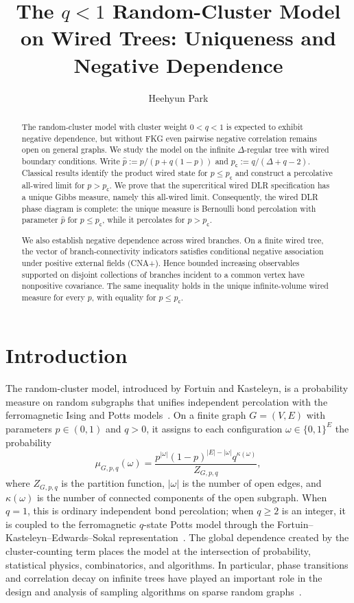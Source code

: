 \documentclass[11pt]{amsart}
\title{The $q<1$ Random-Cluster Model on Wired Trees: Uniqueness and Negative Dependence}
\author{Heehyun Park}
\theoremstyle{plain}
\theoremstyle{definition}
\theoremstyle{remark}
\begin{document}
\begin{abstract}
The random-cluster model with cluster weight $0<q<1$ is expected to exhibit negative dependence, but without FKG even pairwise negative correlation remains open on general graphs. We study the model on the infinite $\Delta$-regular tree with wired boundary conditions. Write $\widehat p:=p/(p+q(1-p))$ and $p_{\mathsf c}:=q/(\Delta+q-2)$. Classical results identify the product wired state for $p\le p_{\mathsf c}$ and construct a percolative all-wired limit for $p>p_{\mathsf c}$. We prove that the supercritical wired DLR specification has a unique Gibbs measure, namely this all-wired limit. Consequently, the wired DLR phase diagram is complete: the unique measure is Bernoulli bond percolation with parameter $\widehat p$ for $p\le p_{\mathsf c}$, while it percolates for $p>p_{\mathsf c}$.

We also establish negative dependence across wired branches. On a finite wired tree, the vector of branch-connectivity indicators satisfies conditional negative association under positive external fields (CNA+). Hence bounded increasing observables supported on disjoint collections of branches incident to a common vertex have nonpositive covariance. The same inequality holds in the unique infinite-volume wired measure for every $p$, with equality for $p\le p_{\mathsf c}$.
\end{abstract}

\maketitle
\section{Introduction}

The random-cluster model, introduced by Fortuin and Kasteleyn, is a probability measure on random subgraphs that unifies independent percolation with the ferromagnetic Ising and Potts models~\cite{fortuinKasteleyn1972random,grimmett2006randomcluster}. On a finite graph $G=(V,E)$ with parameters $p\in(0,1)$ and $q>0$, it assigns to each configuration $\omega\in\{0,1\}^E$ the probability
\[
    \mu_{G,p,q}(\omega)
    =
    \frac{
        p^{|\omega|}(1-p)^{|E|-|\omega|}q^{\kappa(\omega)}
    }{
        Z_{G,p,q}
    },
\]
where $Z_{G,p,q}$ is the partition function, $|\omega|$ is the number of open edges, and $\kappa(\omega)$ is the number of connected components of the open subgraph. When $q=1$, this is ordinary independent bond percolation; when $q\ge2$ is an integer, it is coupled to the ferromagnetic $q$-state Potts model through the Fortuin--Kasteleyn--Edwards--Sokal representation~\cite{edwardsSokal1988}. The global dependence created by the cluster-counting term places the model at the intersection of probability, statistical physics, combinatorics, and algorithms. In particular, phase transitions and correlation decay on infinite trees have played an important role in the design and analysis of sampling algorithms on sparse random graphs~\cite{blancaEtAl2020sampling,blancaGheissari2021treeUniqueness,blanca2023sampling}.
\end{document}

